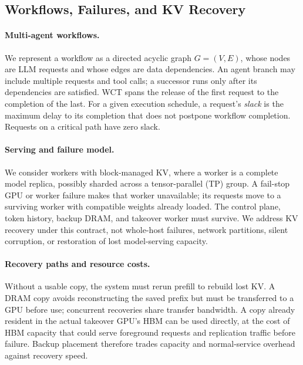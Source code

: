 \subsection{Workflows, Failures, and KV Recovery}
\label{sec:motivation-background}

\paragraph{Multi-agent workflows.}
We represent a workflow as a directed acyclic graph $G=(V,E)$, whose nodes
are LLM requests and whose edges are data dependencies. An agent branch may
include multiple requests and tool calls; a successor runs only after its
dependencies are satisfied. WCT spans the release of the first request to
the completion of the last. For a given execution schedule, a request's
\emph{slack} is the maximum delay to its completion that does not postpone
workflow completion. Requests on a critical path have zero slack.

\paragraph{Serving and failure model.}
We consider workers with block-managed KV, where a worker is a complete
model replica, possibly sharded across a tensor-parallel (TP) group.
A fail-stop GPU or worker failure makes that worker unavailable; its
requests move to a surviving worker with compatible weights already
loaded. The control plane, token history, backup DRAM, and takeover worker
must survive. We address KV recovery under this contract, not whole-host
failures, network partitions, silent corruption, or restoration of lost
model-serving capacity.

\paragraph{Recovery paths and resource costs.}
Without a usable copy, the system must rerun prefill to rebuild lost KV.
A DRAM copy avoids reconstructing the saved prefix but must be transferred
to a GPU before use; concurrent recoveries share transfer bandwidth.
A copy already resident in the actual takeover GPU's HBM can be used
directly, at the cost of HBM capacity that could serve foreground requests
and replication traffic before failure. Backup placement therefore trades
capacity and normal-service overhead against recovery speed.

